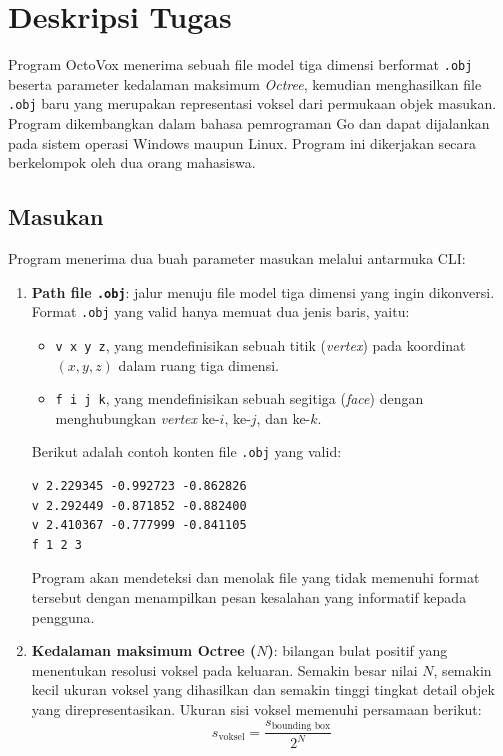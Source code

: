 \section{Deskripsi Tugas}

Program OctoVox menerima sebuah file model tiga dimensi berformat \texttt{.obj}
beserta parameter kedalaman maksimum \textit{Octree}, kemudian menghasilkan file
\texttt{.obj} baru yang merupakan representasi voksel dari permukaan objek masukan.
Program dikembangkan dalam bahasa pemrograman Go dan dapat dijalankan pada sistem
operasi Windows maupun Linux. Program ini dikerjakan secara berkelompok oleh dua
orang mahasiswa.

\subsection{Masukan}

Program menerima dua buah parameter masukan melalui antarmuka CLI:

\begin{enumerate}
    \item \textbf{Path file \texttt{.obj}}: jalur menuju file model tiga dimensi
    yang ingin dikonversi. Format \texttt{.obj} yang valid hanya memuat dua jenis
    baris, yaitu:
    \begin{itemize}
        \item \texttt{v x y z}, yang mendefinisikan sebuah titik (\textit{vertex})
        pada koordinat $(x, y, z)$ dalam ruang tiga dimensi.
        \item \texttt{f i j k}, yang mendefinisikan sebuah segitiga (\textit{face})
        dengan menghubungkan \textit{vertex} ke-$i$, ke-$j$, dan ke-$k$.
    \end{itemize}
    Berikut adalah contoh konten file \texttt{.obj} yang valid:
    \begin{verbatim}
v 2.229345 -0.992723 -0.862826
v 2.292449 -0.871852 -0.882400
v 2.410367 -0.777999 -0.841105
f 1 2 3
    \end{verbatim}
    Program akan mendeteksi dan menolak file yang tidak memenuhi format tersebut
    dengan menampilkan pesan kesalahan yang informatif kepada pengguna.

    \item \textbf{Kedalaman maksimum Octree ($N$)}: bilangan bulat positif yang
    menentukan resolusi voksel pada keluaran. Semakin besar nilai $N$, semakin
    kecil ukuran voksel yang dihasilkan dan semakin tinggi tingkat detail objek
    yang direpresentasikan. Ukuran sisi voksel memenuhi persamaan berikut:
    \begin{equation}
        s_{\text{voksel}} = \frac{s_{\text{bounding box}}}{2^N}
    \end{equation}
\end{enumerate}


